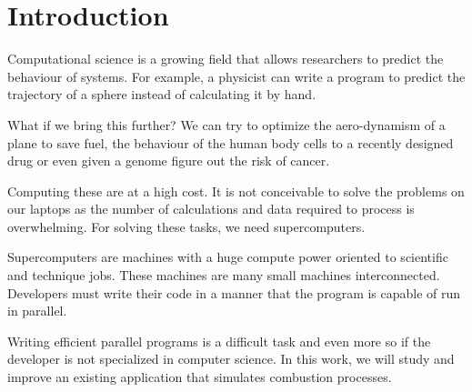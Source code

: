 \section{Introduction}

Computational science is a growing field that allows researchers to predict the behaviour of systems. For example, a physicist can write a program to predict the trajectory of a sphere instead of calculating it by hand.

 What if we bring this further?  We can try to optimize the aero-dynamism of a plane to save fuel, the behaviour of the human body cells to a recently designed drug or even given a genome figure out the risk of cancer.

Computing these are at a high cost. It is not conceivable to solve the problems on our laptops as the number of calculations and data required to process is overwhelming. For solving these tasks, we need supercomputers.

Supercomputers are machines with a huge compute power oriented to scientific and technique jobs. These machines are many small machines interconnected. Developers must write their code in a manner that the program is capable of run in parallel. 

Writing efficient parallel programs is a difficult task and even more so if the developer is not specialized in computer science. In this work, we will study and improve an existing application that simulates combustion processes.

